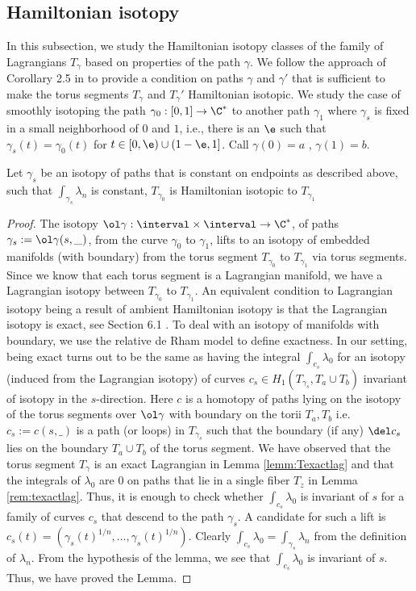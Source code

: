  
 
 \subsection{Hamiltonian isotopy} \label{ssub:hamiso}
 
 
In this subsection, we study the Hamiltonian isotopy classes of the family of Lagrangians $T_\gamma$ based on properties of the path $\gamma$. We follow the approach of Corollary 2.5 in \cite{lekiliRational} to provide a condition on paths $\gamma$ and $\gamma'$ that is sufficient to make the torus segments $T_\gamma$ and $T_\gamma'$ Hamiltonian isotopic. We study the case of smoothly isotoping the path $\gamma_0 : [0,1] \to \C^*$ to another path $\gamma_1$ where $\gamma_s$ is fixed in a small neighborhood of $0$ and $1$, i.e., there is an $\e$ such that $\gamma_s (t) = \gamma_0 (t)$ for $t\in [0,\e) \cup (1-\e,1]$. Call $\gamma(0)=a$ , $\gamma(1)=b$.
\begin{lemma}\label{lemm:hamiso}
Let $\gamma_s$ be an isotopy of paths that is constant on endpoints as described above, such that $\int_{\gamma_s}\lambda_n$ is constant, $T_{\gamma_0} $ is Hamiltonian isotopic to $T_{\gamma_1}$
\end{lemma}
 
\begin{proof}
The isotopy $\ol \gamma:\interval \times \interval \to \C^*$, of paths $\gamma_s:=\ol \gamma (s,\_)$, from the curve $\gamma_0$ to $\gamma_1$, lifts to an isotopy of embedded manifolds (with boundary) from the torus segment $T_{\gamma_0}$ to $T_{\gamma_1}$ via torus segments. Since we know that each torus segment is a Lagrangian manifold, we have a Lagrangian isotopy between $T_{\gamma_0}$ to $T_{\gamma_1}$. An equivalent condition to Lagrangian isotopy being a result of ambient Hamiltonian isotopy is that the Lagrangian isotopy is exact, see Section 6.1 \cite{polGeom}. To deal with an isotopy of  manifolds with boundary,  we use the relative de Rham model to define exactness. In our setting, being exact turns out to be the same as having the integral $\int_{c_s} \lambda_0$ for an isotopy (induced from the Lagrangian isotopy) of curves $c_s \in H_1(T_{\gamma_s},T_a \cup T_b)$ invariant of isotopy in the $s$-direction. Here $c$ is a homotopy of paths lying on the isotopy of the torus segments over $\ol \gamma$ with boundary on the torii $T_a,T_b$ i.e. $c_s:=c(s,\_)$ is a path (or loops) in $T_{\gamma_{s}}$ such that the boundary (if any) $\del c_s$ lies on the boundary $T_a \cup T_b$ of the torus segment. We have observed that the torus segment $T_\gamma$ is an exact Lagrangian in Lemma \ref{lemm:Texactlag} and that the integrals of $\lambda_0$ are 0 on paths that lie in a single fiber  $T_z$ in Lemma \ref{rem:texactlag}. Thus,  it is enough to check whether $\int_{c_s} \lambda_0$ is invariant of $s$ for a family of curves $c_s$ that descend to the path $\gamma_s$. A candidate for such a lift is $c_s(t) = (\gamma_s(t)^{1/n}, \dots, \gamma_s(t)^{1/n})$. Clearly $\int_{c_s}\lambda_0 = \int_{\gamma_s} \lambda_n$ from the definition of $\lambda_n$. From the hypothesis of the lemma, we see that $\int_{c_s}\lambda_0$ is invariant of $s$. Thus, we have proved the Lemma.

\end{proof}

